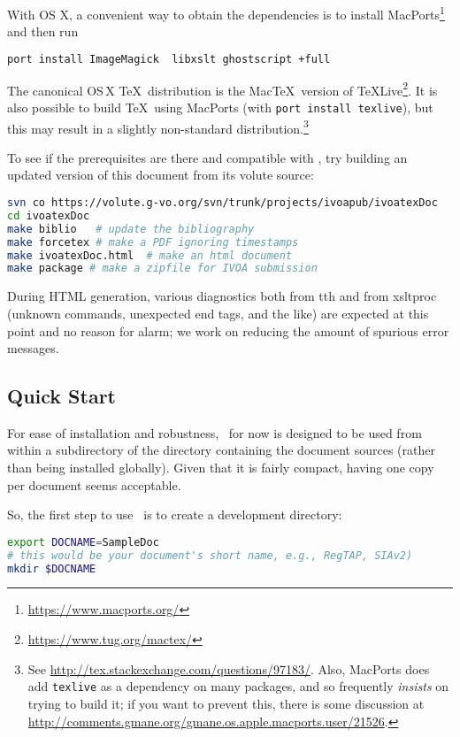 \documentclass[11pt,a4paper]{ivoa}
\begin{document}
With OS X, a convenient way to obtain the dependencies is to install
MacPorts\footnote{\url{https://www.macports.org/}} and then run
\begin{lstlisting}[language=sh]
port install ImageMagick  libxslt ghostscript +full
\end{lstlisting}
The canonical OS\,X \TeX\ distribution is the Mac\TeX\ version of
\TeX Live\footnote{\url{https://www.tug.org/mactex/}}.  It is also
possible to build \TeX\ using MacPorts (with \texttt{port install
  texlive}), but this may result in a slightly non-standard
distribution.\footnote{See
  \url{http://tex.stackexchange.com/questions/97183/}.
  Also, MacPorts does add
  \texttt{texlive} as a dependency on many packages, and so frequently
  \emph{insists} on trying to build it; if you want to prevent this,
  there is some discussion at
  \url{http://comments.gmane.org/gmane.os.apple.macports.user/21526}.}

To see if the prerequisites are there and compatible with \ivoatex, try
building an updated version of this document from its volute source:
\begin{lstlisting}[language=sh]
svn co https://volute.g-vo.org/svn/trunk/projects/ivoapub/ivoatexDoc
cd ivoatexDoc
make biblio   # update the bibliography
make forcetex # make a PDF ignoring timestamps
make ivoatexDoc.html  # make an html document
make package # make a zipfile for IVOA submission
\end{lstlisting}
During HTML generation, various diagnostics both 
from tth and from xsltproc (unknown commands,
unexpected end tags, and the like) are
expected at this point and no reason for alarm; we work on reducing the
amount of spurious error messages.

\subsection{Quick Start}

For ease of installation and robustness, \ivoatex\ for now is designed
to be used from within a subdirectory of the directory containing the
document sources (rather than being installed globally).  Given that
it is fairly compact, having one copy per document seems acceptable.

So, the first step to use \ivoatex\ is to create a development
directory:

\begin{lstlisting}[language=sh]
export DOCNAME=SampleDoc
# this would be your document's short name, e.g., RegTAP, SIAv2)
mkdir $DOCNAME
\end{lstlisting}
\end{document}
